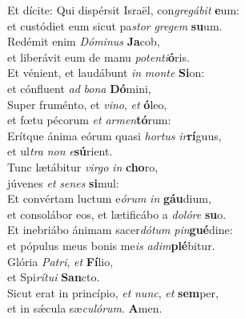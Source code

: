 \evenverse Et dícite: Qui dispérsit Israël, con\textit{gre}\textit{gá}\textit{bit} \textbf{e}um:~\*\\
\evenverse et custódiet eum sicut pa\textit{stor} \textit{gre}\textit{gem} \textbf{su}um.\\
\oddverse Redémit enim \textit{Dó}\textit{mi}\textit{nus} \textbf{Ja}cob,~\*\\
\oddverse et liberávit eum de manu \textit{po}\textit{ten}\textit{ti}\textbf{ó}ris.\\
\evenverse Et vénient, et laudábunt \textit{in} \textit{mon}\textit{te} \textbf{Si}on:~\*\\
\evenverse et cónfluent \textit{ad} \textit{bo}\textit{na} \textbf{Dó}mini,\\
\oddverse Super fruménto, et \textit{vi}\textit{no}, \textit{et} \textbf{ó}leo,~\*\\
\oddverse et fœtu pécorum \textit{et} \textit{ar}\textit{men}\textbf{tó}rum:\\
\evenverse Erítque ánima eórum quasi \textit{hor}\textit{tus} \textit{ir}\textbf{rí}guus,~\*\\
\evenverse et ul\textit{tra} \textit{non} \textit{e}\textbf{sú}rient.\\
\oddverse Tunc lætábitur \textit{vir}\textit{go} \textit{in} \textbf{cho}ro,~\*\\
\oddverse júvenes \textit{et} \textit{se}\textit{nes} \textbf{si}mul:\\
\evenverse Et convértam luctum e\textit{ó}\textit{rum} \textit{in} \textbf{gáu}dium,~\*\\
\evenverse et consolábor eos, et lætificábo a \textit{do}\textit{ló}\textit{re} \textbf{su}o.\\
\oddverse Et inebriábo ánimam sacer\textit{dó}\textit{tum} \textit{pin}\textbf{gué}dine:~\*\\
\oddverse et pópulus meus bonis me\textit{is} \textit{a}\textit{dim}\textbf{plé}bitur.\\
\evenverse Glória \textit{Pa}\textit{tri}, \textit{et} \textbf{Fí}lio,~\*\\
\evenverse et Spi\textit{rí}\textit{tu}\textit{i} \textbf{San}cto.\\
\oddverse Sicut erat in princípio, \textit{et} \textit{nunc}, \textit{et} \textbf{sem}per,~\*\\
\oddverse et in sǽcula sæ\textit{cu}\textit{ló}\textit{rum}. \textbf{A}men.\\
